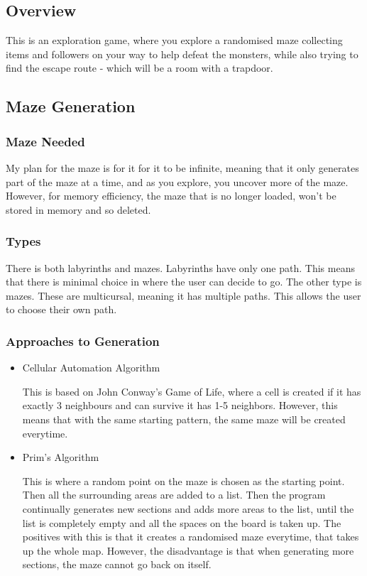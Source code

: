 \documentclass[../Main.tex]{subfiles}
\begin{document}
    \subsection{Overview}
        This is an exploration game, where you explore a randomised maze collecting items and followers on your way to help defeat the monsters, while also trying to find the escape route - which will be a room with a trapdoor.
    \subsection{Maze Generation}
        \subsubsection{Maze Needed}
            My plan for the maze is for it for it to be infinite, meaning that it only generates part of the maze at a time, and as you explore, you uncover more of the maze. However, for memory efficiency, the maze that is no longer loaded, won't be stored in memory and so deleted.
        \subsubsection{Types}
            There is both labyrinths and mazes. Labyrinths have only one path. This means that there is minimal choice in where the user can decide to go.
            The other type is mazes. These are multicursal, meaning it has multiple paths. This allows the user to choose their own path.
        \subsubsection{Approaches to Generation}
            \begin{itemize}
                \item Cellular Automation Algorithm

                This is based on John Conway's Game of Life, where a cell is created if it has exactly 3 neighbours and can survive it has 1-5 neighbors. However, this means that with the same starting pattern, the same maze will be created everytime.

                \item Prim's Algorithm

                This is where a random point on the maze is chosen as the starting point. Then all the surrounding areas are added to a list. Then the program continually generates new sections and adds more areas to the list, until the list is completely empty and all the spaces on the board is taken up. The positives with this is that it creates a randomised maze everytime, that takes up the whole map. However, the disadvantage is that when generating more sections, the maze cannot go back on itself.
            \end{itemize}
\end{document}
